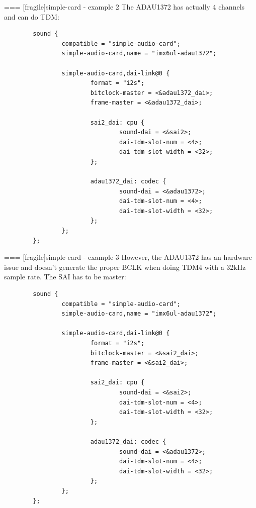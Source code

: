 === [fragile]{simple-card - example 2}
  The ADAU1372 has actually 4 channels and can do TDM:
  \begin{block}{}
    \fontsize{7}{6}\selectfont
    \begin{verbatim}
        sound {
                compatible = "simple-audio-card";
                simple-audio-card,name = "imx6ul-adau1372";

                simple-audio-card,dai-link@0 {
                        format = "i2s";
                        bitclock-master = <&adau1372_dai>;
                        frame-master = <&adau1372_dai>;

                        sai2_dai: cpu {
                                sound-dai = <&sai2>;
                                dai-tdm-slot-num = <4>;
                                dai-tdm-slot-width = <32>;
                        };

                        adau1372_dai: codec {
                                sound-dai = <&adau1372>;
                                dai-tdm-slot-num = <4>;
                                dai-tdm-slot-width = <32>;
                        };
                };
        };
    \end{verbatim}
  \end{block}


=== [fragile]{simple-card - example 3}
  However, the ADAU1372 has an hardware issue and doesn't generate the
  proper BCLK when doing TDM4 with a 32kHz sample rate. The SAI has to
  be master:
  \begin{block}{}
    \fontsize{7}{6}\selectfont
    \begin{verbatim}
        sound {
                compatible = "simple-audio-card";
                simple-audio-card,name = "imx6ul-adau1372";

                simple-audio-card,dai-link@0 {
                        format = "i2s";
                        bitclock-master = <&sai2_dai>;
                        frame-master = <&sai2_dai>;

                        sai2_dai: cpu {
                                sound-dai = <&sai2>;
                                dai-tdm-slot-num = <4>;
                                dai-tdm-slot-width = <32>;
                        };

                        adau1372_dai: codec {
                                sound-dai = <&adau1372>;
                                dai-tdm-slot-num = <4>;
                                dai-tdm-slot-width = <32>;
                        };
                };
        };
    \end{verbatim}
  \end{block}


